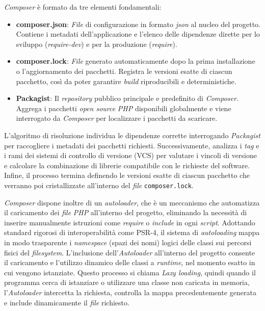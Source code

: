 \textit{Composer} è formato da tre elementi fondamentali:\\
\begin{itemize}
	\item \textbf{composer.json}: \textit{File} di configurazione in formato \textit{json} al nucleo del progetto. Contiene i metadati dell’applicazione e l’elenco delle dipendenze dirette per lo sviluppo (\textit{require-dev}) e per la produzione (\textit{require}).
	\item \textbf{composer.lock}: \textit{File} generato automaticamente dopo la prima installazione o l’aggiornamento dei pacchetti. Registra le versioni esatte di ciascun pacchetto, così da poter garantire \textit{build} riproducibili e deterministiche.
	\item \textbf{Packagist}: Il \textit{repository} pubblico principale e predefinito di \textit{Composer}. Aggrega i pacchetti \textit{open source} \textit{PHP} disponibili globalmente e viene interrogato da \textit{Composer} per localizzare i pacchetti da scaricare.
\end{itemize}

L’algoritmo di risoluzione individua le dipendenze corrette interrogando \textit{Packagist} per raccogliere i metadati dei pacchetti richiesti. Successivamente, analizza i \textit{tag} e i rami dei sistemi di controllo di versione (VCS) per valutare i vincoli di versione e calcolare la combinazione di librerie compatibile con le richieste del software. Infine, il processo termina definendo le versioni esatte di ciascun pacchetto che verranno poi cristallizzate all'interno del \textit{file} \texttt{composer.lock}.

\textit{Composer} dispone inoltre di un \textit{autoloader}, che è un meccanismo che automatizza il caricamento dei \textit{file} \textit{PHP} all’interno del progetto, eliminando la necessità di inserire manualmente istruzioni come \textit{require} o \textit{include} in ogni \textit{script}. Adottando standard rigorosi di interoperabilità come PSR-4, il sistema di \textit{autoloading} mappa in modo trasparente i \textit{namespace} (spazi dei nomi) logici delle classi sui percorsi fisici del \textit{filesystem}.
L’inclusione dell’\textit{Autoloader} all’interno del progetto consente il caricamento e l'utilizzo dinamico delle classi a \textit{runtime}, nel momento esatto in cui vengono istanziate. Questo processo si chiama \textit{Lazy loading}, quindi quando il programma cerca di istanziare o utilizzare una classe non caricata in memoria, l’\textit{Autoloader} intercetta la richiesta, controlla la mappa precedentemente generata e include dinamicamente il \textit{file} richiesto.